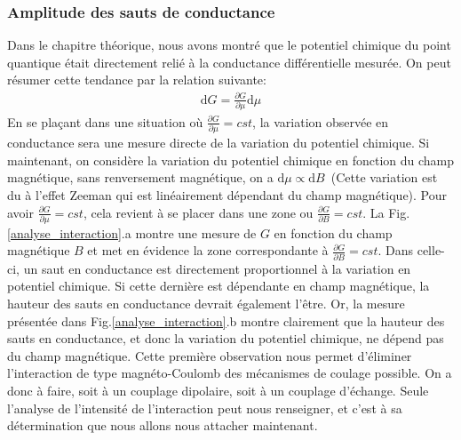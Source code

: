 \subsubsection{Amplitude des sauts de conductance}
Dans le chapitre théorique, nous avons montré que le potentiel chimique du point quantique était directement relié à la conductance différentielle mesurée. On peut résumer cette tendance par la relation suivante:
\begin{eqnarray}
\text{d}G = \frac{\partial G}{\partial \mu} \text{d} \mu
\end{eqnarray}
En se plaçant dans une situation où $\frac{\partial G}{\partial \mu} = cst$, la variation observée en conductance sera une mesure directe de la variation du potentiel chimique. Si maintenant, on considère la variation du potentiel chimique en fonction du champ magnétique, sans renversement magnétique, on a $\text{d}\mu \propto \text{d}B$~(Cette variation est du à l'effet Zeeman qui est linéairement dépendant du champ magnétique). Pour avoir $\frac{\partial G}{\partial \mu} = cst$, cela revient à se placer dans une zone ou $\frac{\partial G}{\partial B} = cst$. La Fig.\ref{analyse_interaction}.a montre une mesure de $G$ en fonction du champ magnétique $B$ et met en évidence la zone correspondante à $\frac{\partial G}{\partial B} = cst$. Dans celle-ci, un saut en conductance est directement proportionnel à la variation en potentiel chimique. Si cette dernière est dépendante en champ magnétique, la hauteur des sauts en conductance devrait également l’être. Or, la mesure présentée dans Fig.\ref{analyse_interaction}.b montre clairement que la hauteur des sauts en conductance, et donc la variation du potentiel chimique, ne dépend pas du champ magnétique. Cette première observation nous permet d'éliminer l'interaction de type magnéto-Coulomb des mécanismes de coulage possible. On a donc à faire, soit à un couplage dipolaire, soit à un couplage d'échange. Seule l'analyse de l'intensité de l'interaction peut nous renseigner, et c'est à sa détermination que nous allons nous attacher maintenant.

